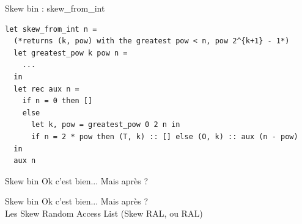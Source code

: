 \documentclass{beamer}
\begin{document}
\begin{frame}[fragile]{Skew bin : skew\_from\_int}
\begin{lstlisting}
let skew_from_int n =
  (*returns (k, pow) with the greatest pow < n, pow 2^{k+1} - 1*) 
  let greatest_pow k pow n =
    ...
  in
  let rec aux n =
    if n = 0 then []
    else
      let k, pow = greatest_pow 0 2 n in
      if n = 2 * pow then (T, k) :: [] else (O, k) :: aux (n - pow)
  in
  aux n
\end{lstlisting}
\end{frame}

\begin{frame}{Skew bin}
    Ok c'est bien... Mais après ?\\
    \phantom{Les Skew Random Access List (Skew RAL, ou RAL)}
    
\end{frame}

\begin{frame}{Skew bin}
    Ok c'est bien... Mais après ?\\
    Les Skew Random Access List (Skew RAL, ou RAL)
    
\end{frame}
\end{document}
